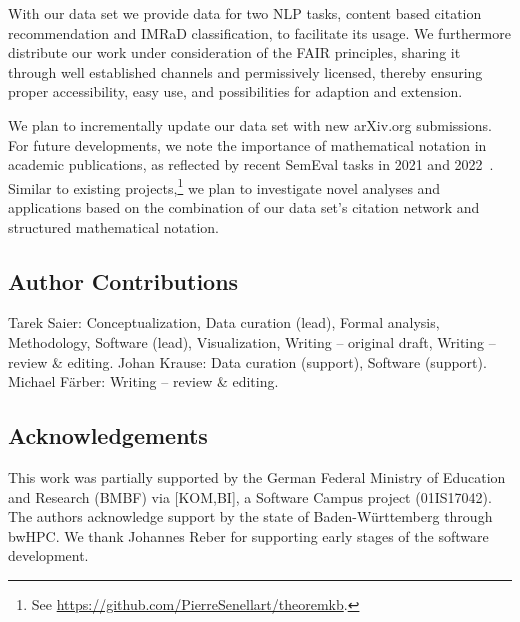 With our data set we provide data for two NLP tasks, content based citation recommendation and IMRaD classification, to facilitate its usage. We furthermore distribute our work under consideration of the FAIR principles, sharing it through well established channels and permissively licensed, thereby ensuring proper accessibility, easy use, and possibilities for adaption and extension.

We plan to incrementally update our data set with new arXiv.org submissions. For future developments, we note the importance of mathematical notation in academic publications, as reflected by recent SemEval tasks in 2021 and 2022~\cite{semeval21_task8,semeval22_task12}. Similar to existing projects,\footnote{See \url{https://github.com/PierreSenellart/theoremkb}.} we plan to investigate novel analyses and applications based on the combination of our data set's citation network and structured mathematical notation.





\subsection*{Author Contributions}  %
Tarek Saier: Conceptualization, Data curation (lead), Formal analysis, Methodology, Software (lead), Visualization, Writing -- original draft, Writing -- review \& editing. Johan Krause: Data curation (support), Software (support). Michael F{\"a}rber: Writing -- review \& editing.

\subsection*{Acknowledgements}
This work was partially supported by the German Federal Ministry of Education and Research (BMBF) via [KOM,BI], a Software Campus project (01IS17042).
The authors acknowledge support by the state of Baden-W{\"u}rttemberg through bwHPC.
We thank Johannes Reber for supporting early stages of the software development.
